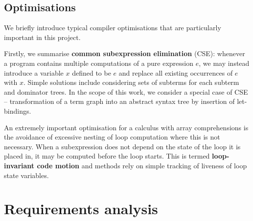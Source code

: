
\subsection{Optimisations} \label{general-optimisations}

We briefly introduce typical compiler optimisations that are particularly important in this project.

Firstly, we summarise \textbf{common subexpression elimination} (CSE): whenever a program contains multiple computations of a pure expression $e$, we may instead introduce a variable $x$ defined to be $e$ and replace all existing occurrences of $e$ with $x$. Simple solutions include considering sets of subterms for each subterm and dominator trees. In the scope of this work, we consider a special case of CSE -- transformation of a term graph into an abstract syntax tree by insertion of let-bindings.

An extremely important optimisation for a calculus with array comprehensions is the avoidance of excessive nesting of loop computation where this is not necessary. When a subexpression does not depend on the state of the loop it is placed in, it may be computed before the loop starts. This is termed \textbf{loop-invariant code motion} and methods rely on simple tracking of liveness of loop state variables.

\section{Requirements analysis}

